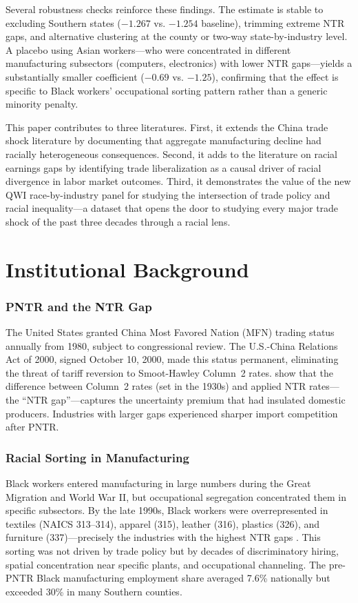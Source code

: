 \documentclass[12pt]{article}
\begin{document}
Several robustness checks reinforce these findings. The estimate is stable to excluding Southern states ($-1.267$ vs. $-1.254$ baseline), trimming extreme NTR gaps, and alternative clustering at the county or two-way state-by-industry level. A placebo using Asian workers---who were concentrated in different manufacturing subsectors (computers, electronics) with lower NTR gaps---yields a substantially smaller coefficient ($-0.69$ vs. $-1.25$), confirming that the effect is specific to Black workers' occupational sorting pattern rather than a generic minority penalty.

This paper contributes to three literatures. First, it extends the China trade shock literature \citep{autor2013, pierce2016, acemoglu2016} by documenting that aggregate manufacturing decline had racially heterogeneous consequences. Second, it adds to the literature on racial earnings gaps \citep{bound1992, neal1996, lang2020} by identifying trade liberalization as a causal driver of racial divergence in labor market outcomes. Third, it demonstrates the value of the new QWI race-by-industry panel for studying the intersection of trade policy and racial inequality---a dataset that opens the door to studying every major trade shock of the past three decades through a racial lens.

\section{Institutional Background}

\subsubsection*{PNTR and the NTR Gap} The United States granted China Most Favored Nation (MFN) trading status annually from 1980, subject to congressional review. The U.S.-China Relations Act of 2000, signed October 10, 2000, made this status permanent, eliminating the threat of tariff reversion to Smoot-Hawley Column~2 rates. \citet{pierce2016} show that the difference between Column~2 rates (set in the 1930s) and applied NTR rates---the ``NTR gap''---captures the uncertainty premium that had insulated domestic producers. Industries with larger gaps experienced sharper import competition after PNTR.

\subsubsection*{Racial Sorting in Manufacturing} Black workers entered manufacturing in large numbers during the Great Migration and World War II, but occupational segregation concentrated them in specific subsectors. By the late 1990s, Black workers were overrepresented in textiles (NAICS 313--314), apparel (315), leather (316), plastics (326), and furniture (337)---precisely the industries with the highest NTR gaps \citep{bound1992, wilson2000}. This sorting was not driven by trade policy but by decades of discriminatory hiring, spatial concentration near specific plants, and occupational channeling. The pre-PNTR Black manufacturing employment share averaged 7.6\% nationally but exceeded 30\% in many Southern counties.
\end{document}
